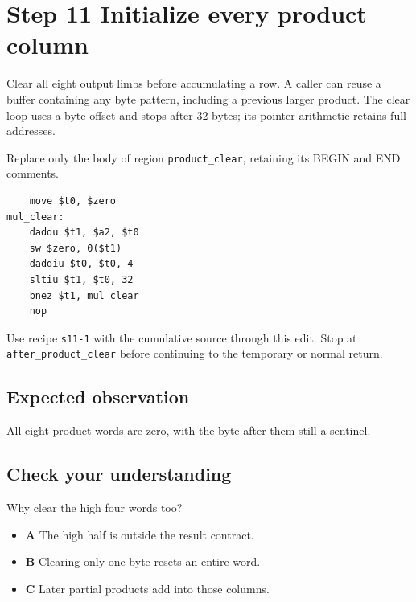 \section{Step 11 Initialize every product column}\label{rsa-s11}

Clear all eight output limbs before accumulating a row. A caller can reuse a buffer containing any byte pattern, including a previous larger product. The clear loop uses a byte offset and stops after 32 bytes; its pointer arithmetic retains full addresses.

Replace only the body of region \texttt{product\_clear}, retaining its BEGIN and END comments.

\begin{verbatim}
    move $t0, $zero
mul_clear:
    daddu $t1, $a2, $t0
    sw $zero, 0($t1)
    daddiu $t0, $t0, 4
    sltiu $t1, $t0, 32
    bnez $t1, mul_clear
    nop
\end{verbatim}

Use recipe \texttt{s11-1} with the cumulative source through this edit. Stop at \texttt{after\_product\_clear} before continuing to the temporary or normal return.

\subsection{Expected observation}
All eight product words are zero, with the byte after them still a sentinel.

\subsection{Check your understanding}
Why clear the high four words too?

\begin{itemize}
  \item \textbf{A} The high half is outside the result contract.
  \item \textbf{B} Clearing only one byte resets an entire word.
  \item \textbf{C} Later partial products add into those columns.
\end{itemize}
